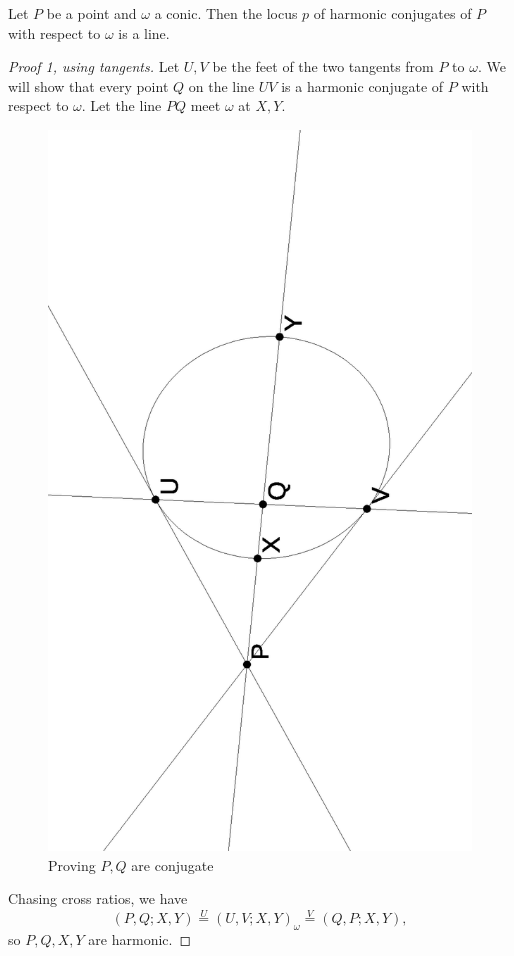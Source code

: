 \begin{thm} Let $P$ be a point and $\omega$ a conic. Then the locus $p$ of harmonic conjugates of $P$ with respect to $\omega$ is a line.
\end{thm}
\begin{proof}[Proof 1, using tangents] Let $U,V$ be the feet of the two tangents from $P$ to $\omega$. We will show that every point $Q$ on the line $UV$ is a harmonic conjugate of $P$ with respect to $\omega$. Let the line $PQ$ meet $\omega$ at $X,Y$.

\begin{figure}[!htb]
\centering
\includegraphics[scale=0.5,angle=270]{polartang.eps}
\caption{Proving $P,Q$ are conjugate}
\end{figure}

Chasing cross ratios, we have
\[
(P,Q;X,Y) \stackrel{U}{=} (U,V;X,Y)_\omega \stackrel{V}{=} (Q,P;X,Y),
\]
so $P,Q,X,Y$ are harmonic.
\end{proof}
